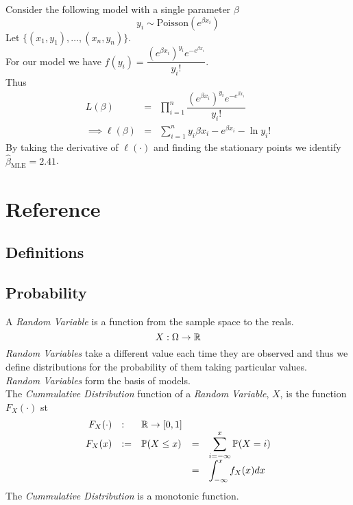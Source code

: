 \documentclass[11pt,a4paper]{article}
\begin{document}
\example{}
Consider the following model with a single parameter $\beta$
$$y_i\sim\text{Poisson}(e^{\beta x_i})$$
Let $\{(x_1,y_1),\dots,(x_n,y_n)\}$.\\
For our model we have $f(y_i)=\dfrac{(e^{\beta x_i})^{y_i}e^{-e^{\beta x_i}}}{y_i!}$.\\
Thus
\[\begin{array}{rcl}
L(\beta)&=&\displaystyle{\prod_{i=1}^n\dfrac{(e^{\beta x_i})^{y_i}e^{-e^{\beta x_i}}}{y_i!}}\\
\implies\ell(\beta)&=&\sum_{i=1}^ny_i\beta x_i-e^{\beta x_i}-\ln y_i!
\end{array}\]
By taking the derivative of $\ell(\cdot)$ and finding the stationary points we identify $\hat\beta_\text{MLE}=2.41$.

\newpage
\setcounter{section}{-1}
\section{Reference}

\subsection{Definitions}







\subsection{Probability}

A \textit{Random Variable} is a function from the sample space to the reals.
$$X:\Omega\to\mathbb{R}$$
\textit{Random Variables} take a different value each time they are observed and thus we define distributions for the probability of them taking particular values.\\
\textit{Random Variables} form the basis of models.\\

The \textit{Cummulative Distribution} function of a \textit{Random Variable}, $X$, is the function $F_X(\cdot)$ st
\[\begin{array}{rllrl}
F_X(\cdot)&:&\mathbb{R}\to[0,1]\\
F_X(x)&:=&\mathbb{P}(X\leq x)&=&\displaystyle\sum_{i=-\infty}^x\mathbb{P}(X=i)\\
&&&=&\displaystyle\int_{-\infty}^xf_X(x)dx
\end{array}\]
The \textit{Cummulative Distribution} is a monotonic function.\\
\end{document}
